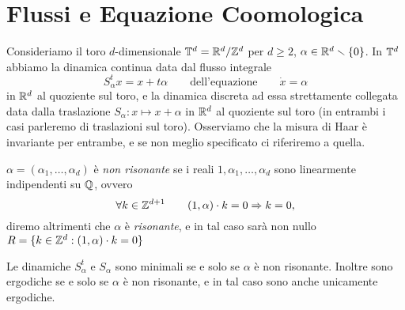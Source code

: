 \section{Flussi e Equazione Coomologica}

Consideriamo il toro $d$-dimensionale $\mathbb{T}^d=\mathbb{R}^d/\mathbb{Z}^d$ per $d\geq 2$, $\alpha\in\mathbb{R}^d\smallsetminus \{0\}$. In $\mathbb{T}^d$ abbiamo la dinamica continua data dal flusso integrale 
\[S^t_\alpha x=x+t\alpha \qquad \mbox{dell'equazione} \qquad \dot x=\alpha\]
in $\mathbb{R}^d$ al quoziente sul toro, e la dinamica discreta ad essa strettamente collegata data dalla traslazione 
$S_\alpha: x\mapsto x+\alpha$ in $\mathbb{R}^d$ al quoziente sul toro (in entrambi i casi parleremo di traslazioni sul toro). 
Osserviamo che la misura di Haar è invariante per entrambe, e se non meglio specificato ci riferiremo a quella.

\begin{defi} $\alpha=(\alpha_1,\dots,\alpha_d)$ è \emph{non risonante} se i reali $1,\alpha_1,\dots,\alpha_d$ sono linearmente indipendenti su $\mathbb{Q}$, ovvero
 \[\forall k\in \mathbb{Z}^{d+1} \qquad (1,\alpha)\cdot k=0 \Rightarrow k=0,\]
 diremo altrimenti che $\alpha$ è \emph{risonante}, e in tal caso sarà non nullo $R=\{k\in\mathbb{Z}^d:(1,\alpha)\cdot k=0\}$
\end{defi}

\begin{teo} Le dinamiche $S^t_\alpha$ e $S_\alpha$ sono minimali se e solo se $\alpha$ è non risonante. 
Inoltre sono ergodiche se e solo se $\alpha$ è non risonante, e in tal caso sono anche unicamente ergodiche.\end{teo}

